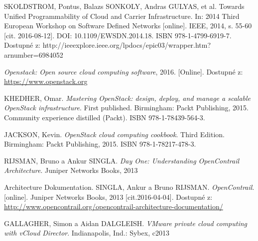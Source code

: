 \begin{thebibliography}{10}
SKOLDSTROM, Pontus, Balazs SONKOLY, Andras GULYAS, et al. Towards Unified Programmability of Cloud and Carrier Infrastructure. In: 2014 Third European Workshop on Software Defined Networks [online]. IEEE, 2014, s. 55-60 [cit. 2016-08-12]. DOI: 10.1109/EWSDN.2014.18. ISBN 978-1-4799-6919-7. Dostupné z: http://ieeexplore.ieee.org/lpdocs/epic03/wrapper.htm?arnumber=6984052




\emph{Openstack:  Open  source  cloud  computing  software},  2016.  [Online]. Dostupné z: \url{https://www.openstack.org}

 KHEDHER, Omar. \emph{Mastering OpenStack: design, deploy, and manage a scalable OpenStack infrastructure}. First published. Birmingham: Packt Publishing, 2015. Community experience distilled (Packt). ISBN 978-1-78439-564-3.

JACKSON, Kevin. \emph{OpenStack cloud computing cookbook}. Third Edition. Birmingham: Packt Publishing, 2015. ISBN 978-1-78217-478-3.


 RIJSMAN, Bruno a Ankur SINGLA. \emph{Day One: Understanding OpenContrail Architecture}. Juniper Networks Books, 2013

 Architecture   Dokumentation.   SINGLA,   Ankur   a   Bruno   RIJSMAN. \emph{OpenContrail}. [online].  Juniper  Networks  Books,   2013  [cit.2016-04-04]. Dostupné    z: \url{http://www.opencontrail.org/opencontrail-architecture-documentation/}




GALLAGHER, Simon a Aidan DALGLEISH. \emph{VMware private cloud computing with vCloud Director}. Indianapolis, Ind.: Sybex, c2013








\end{thebibliography}
